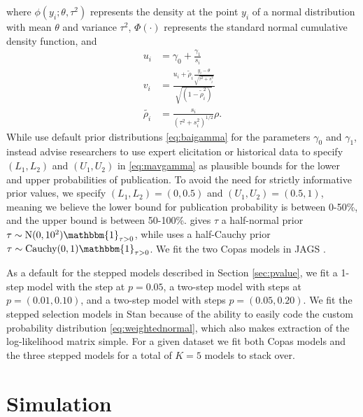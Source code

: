 \documentclass[12pt]{article}   	%
\numberwithin{equation}{section}
\begin{document}
where $\phi(y_i; \theta, \tau^2)$ represents the density at the point $y_i$ of a normal distribution with mean $\theta$ and variance $\tau^2$, $\Phi(\cdot)$ represents the standard normal cumulative density function, and 
\begin{align}
u_i &= \gamma_0 + \frac{\gamma_1}{s_i} \nonumber \\
v_i &= \frac{u_i + \tilde{\rho}_i \frac{y_i - \theta}{\sqrt{\tau^2 + s_i^2}}}{\sqrt{(1 - \tilde{\rho}_i^2)}} \nonumber \\
\tilde{\rho_i} &= \frac{s_i}{(\tau^2 + s_i^2)^{1/2}} \rho. \nonumber
\end{align}
While \citet{bai2020} use default prior distributions \eqref{eq:baigamma} for the parameters $\gamma_0$ and $\gamma_1$, \citet{mavridis2013copas} instead advise researchers to use expert elicitation or historical data to specify $(L_1, L_2)$ and $(U_1, U_2)$ in \eqref{eq:mavgamma} as plausible bounds for the lower and upper probabilities of publication. To avoid the need for strictly informative prior values, we specify $(L_1, L_2) = (0, 0.5)$ and $(U_1, U_2) = (0.5, 1)$, meaning we believe the lower bound for publication probability is between 0-50\%, and the upper bound is between 50-100\%. \citet{mavridis2013copas} gives $\tau$ a half-normal prior $\tau \sim \text{N}(0, 10^2) \mathbbm{1}_{\tau > 0}$, while \citet{bai2020} uses a half-Cauchy prior $\tau \sim \text{Cauchy}(0, 1) \mathbbm{1}_{\tau > 0}$. We fit the two Copas models in JAGS \citep{plummer2003jags}.

As a default for the stepped models described in Section \ref{sec:pvalue}, we fit a 1-step model with the step at $p=0.05$, a two-step model with steps at $p = (0.01, 0.10)$, and a two-step model with steps $p = (0.05, 0.20)$. We fit the stepped selection models in Stan \citep{gelman2015stan} because of the ability to easily code the custom probability distribution \eqref{eq:weightednormal}, which also makes extraction of the log-likelihood matrix simple. For a given dataset we fit both Copas models and the three stepped models for a total of $K=5$ models to stack over.

\section{Simulation} \label{sec:simulation}
\end{document}
